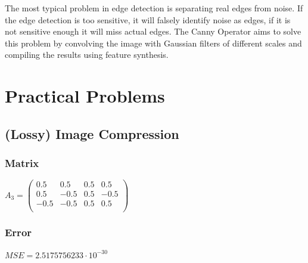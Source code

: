 \documentclass[a4paper,12pt]{article}
\begin{document}
	\subsubsection{}
	The most typical problem in edge detection is separating real edges from noise. If the edge detection is too sensitive, it will falsely identify noise as edges, if it is not sensitive enough it will miss actual edges. The Canny Operator aims to solve this problem by convolving the image with Gaussian filters of different scales and compiling the results using feature synthesis. 
	
	\section{Practical Problems}
	\subsection{(Lossy) Image Compression}
	\subsubsection{Matrix}
	$A_3 =
	\begin{pmatrix}
	0.5 & 0.5 & 0.5 & 0.5\\
	0.5 & -0.5 & 0.5 & -0.5\\
	-0.5 & -0.5 & 0.5 & 0.5\\
    \end{pmatrix}		
	$
	\subsubsection{Error}
	$MSE = 2.5175756233 \cdot 10^{-30}$
	
	\newlength{\colwidth}
	\newlength{\colsep}
	\setlength{\colsep}{8mm}
	\setlength{\colwidth}{\dimexpr.25\textwidth-.75\colsep}
	
\end{document}
